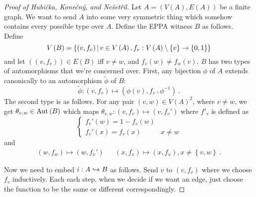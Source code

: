 \documentclass{amsart}
\begin{document}
\begin{proof}[Proof of Hubi\v{c}ka, Kone\v{c}n\'{y}, and Ne\v{s}et\v{r}il]
Let $A = \left( V\left( A \right), E\left( A \right) \right)$ be a finite graph.
We want to send $A$ into some very symmetric thing which somehow contains every possible
type over $A$.
Define the EPPA witness $B$ as follows. 
Define
\begin{equation}
V\left( B \right) = \left\{ \left( v , f_v \right) \, \middle\vert \, v\in V\left( A \right), f_v :
V\left( A \right) \setminus \left\{ v \right\} \rightarrow \left\{ 0,1 \right\} \right\}
\end{equation}
and let $\left( \left( v , f_v \right)\right) \in E\left( B \right)$ iff
$v\neq w$, and $f_v\left( w \right) \neq f_w\left( v \right)$. $B$ has two types of
automorphisms that we're concerned over. First, any bijection $\phi$ of $A$ extends canonically
to an automorphism $\tilde \phi$ of $B$:
\begin{equation}
\tilde \phi : \left( v ,f_v \right) \mapsto \left( \phi\left( v \right) , f_v \comp
\phi^{-1} \right) \ .
\end{equation}
The second type is as follows. For any pair $\left( v,w \right) \in V\left( A
\right)^2$, where $v\neq w$, we get $\theta_{v,w} \in \operatorname{Aut}\left( B \right)$ which maps
$\theta_{v,w} : \left( v , f_v \right) \mapsto \left( v , f_v' \right)$ where $f'_v$ is
defined as
\begin{equation}
\begin{cases}
f_v'\left( w \right) = 1 - f_v\left( w \right) \\
f_v'\left( x \right) = f_v\left( x \right) & x\neq w
\end{cases}
\end{equation}
and
\begin{align}
\left( w , f_w \right) \mapsto \left( w , f_x' \right) &&
\left( x , f_x \right)\mapsto \left( x , f_x \right) , x\neq \left\{ v,w \right\} \ .
\end{align}

Now we need to embed $i : A\hookrightarrow B$ as follows. Send $v$ to $\left( v , f_v \right)$ where we
choose $f_v$ inductively. Each each step, when we decide if we want an edge, just choose
the function to be the same or different correspondingly.


\end{proof}
\end{document}
